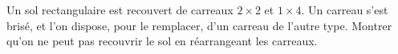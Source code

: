 Un sol rectangulaire est recouvert de carreaux $2 \times 2$ et $1 \times 4$. Un carreau s'est brisé, et l'on dispose, pour le remplacer, d'un carreau de l'autre type. Montrer qu'on ne peut pas recouvrir le sol en réarrangeant les carreaux.
